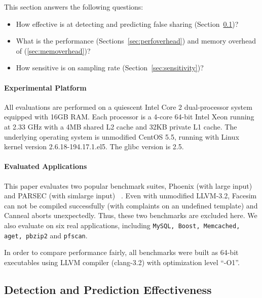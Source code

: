 \label{sec:evaluation}

This section answers the following questions:
\begin{itemize}
\item
  How effective is \Predator{} at detecting and predicting false sharing (Section~\ref{sec:effective})?

\item
  What is the performance (Sections~\ref{sec:perfoverhead}) and memory overhead of \Predator{} (\ref{sec:memoverhead})?

\item 
  How sensitive is \Predator{} on sampling rate (Section~\ref{sec:sensitivity})? 
 
\end{itemize}

\paragraph{Experimental Platform} All evaluations are performed on a quiescent Intel Core 2 dual-processor system equipped with 
16GB RAM. Each processor is a 4-core 64-bit Intel Xeon running at 2.33 GHz with a 4MB shared L2 cache and 32KB private L1 cache. The underlying operating system is unmodified CentOS 5.5, running with Linux kernel version 2.6.18-194.17.1.el5. The glibc version is 2.5. %

\paragraph{Evaluated Applications} 
This paper evaluates two popular benchmark suites,
Phoenix (with large input) ~\cite{phoenix-hpca} and PARSEC (with simlarge input) ~\cite{parsec}. Even with unmodified LLVM-3.2, Facesim can not be compiled successfully (with complaints on an undefined template) and Canneal aborts unexpectedly. Thus, these two benchmarks are excluded here.
We also evaluate \Predator{} on six real applications, including \texttt{MySQL, Boost, Memcached, aget, pbzip2} and \texttt{pfscan}.

In order to compare performance fairly, all benchmarks were built as 64-bit executables 
using LLVM compiler (clang-3.2) with optimization level ``-O1''.

\subsection{Detection and Prediction Effectiveness}
\label{sec:effective}

